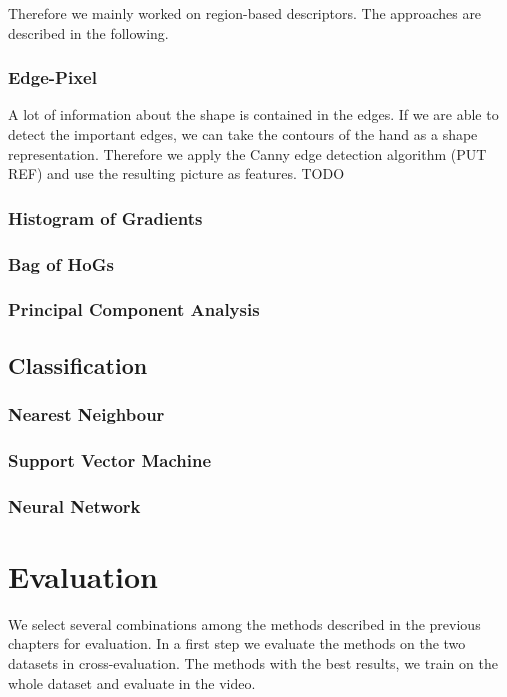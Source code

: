 \documentclass[letterpaper, 10 pt, conference]{ieeeconf}  %
\begin{document}
Therefore we mainly worked on region-based descriptors. The approaches are described in the following.

\subsubsection{Edge-Pixel}

A lot of information about the shape is contained in the edges. If we are able to detect the important edges, we can take the contours of the hand as a shape representation. Therefore we apply the Canny edge detection algorithm (PUT REF) and use the resulting picture as features. TODO

\subsubsection{Histogram of Gradients}

\subsubsection{Bag of HoGs}

\subsubsection{Principal Component Analysis}

\subsection{Classification}

\subsubsection{Nearest Neighbour}

\subsubsection{Support Vector Machine}

\subsubsection{Neural Network}

\section{Evaluation}
\label{sec:eval}
We select several combinations among the methods described in the previous chapters for evaluation. In a first step we evaluate the methods on the two datasets in cross-evaluation. The methods with the best results, we train on the whole dataset and evaluate in the video.
\end{document}

